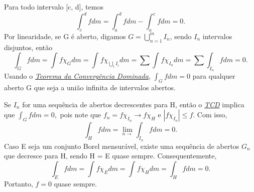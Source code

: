 \documentclass[measure_theory.tex]{subfiles}
\begin{document}
\begin{proof*}
	Para todo intervalo [c, d], temos
	\[
		\int_{c}^{d}f dm = \int_{a}^{d} fdm - \int_{a}^{c} fdm = 0.
	\]
	Por linearidade, se G é aberto, digamos \(G = \bigcup_{n=1}^{m}I_{n}\), sendo \(I_{n}\) intervalos disjuntos, então
	\[
		\int_{G}f dm = \int_{}f \chi_{G} dm = \int_{}f \chi_{\bigcup_{i}^{}I_{i}} dm = \sum\limits_{}^{}\int_{}f \chi_{I_{n}} dm = \sum\limits_{}^{}\int_{I_{n}}f dm = 0.
	\]
	Usando o \hyperlink{dominated_convergence}{\textit{Teorema da Convergência Dominada}}, \(\int_{G}f dm = 0\) para qualquer aberto G que seja a união infinita de intervalos abertos.

	Se \(I_{n}\) for uma sequência de abertos decrescentes para H, então o \hyperlink{dominated_convergence}{\textit{TCD}} implica que \(\int_{G}f dm = 0,\) pois note que
	\(f_{n} = f \chi_{I_{n}}\to f \chi_{H}\) e \(|f \chi_{I_{n}}| \leq f.\) Com isso,
	\[
		\int_{H}f dm = \lim_{n\to } \int_{I_{n}}f dm = 0.
	\]
	Caso E seja um conjunto Borel mensurável, existe uma sequência de abertos \(G_{n}\) que decresce para H, sendo H = E quase sempre. Consequentemente,
	\[
		\int_{E}f dm = \int_{}^{}f \chi_{E} dm = \int_{}f \chi_{H} dm = \int_{H}f dm = 0.
	\]
	Portanto, \(f = 0\) quase sempre. \qedsymbol
\end{proof*}
\end{document}

